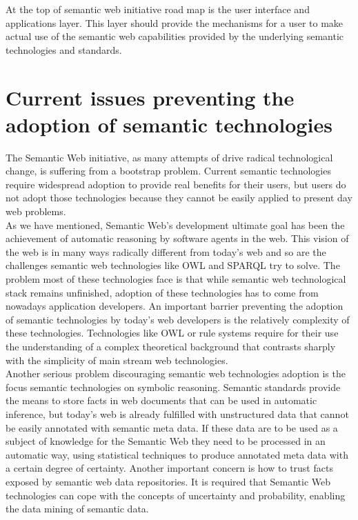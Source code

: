 At the top of semantic web initiative road map is the user interface and applications layer. This layer should provide
the mechanisms for a user to make actual use of the semantic web capabilities provided by the underlying semantic
technologies and standards.

\section{Current issues preventing the adoption of semantic technologies}

The Semantic Web initiative, as many attempts of drive radical technological change, is suffering from a bootstrap
problem. Current semantic technologies require widespread adoption to provide real benefits for their users, but users do not adopt
those technologies because they cannot be easily applied to present day web problems. \\

As we have mentioned, Semantic Web's development ultimate goal has been the achievement of automatic reasoning by software
agents in the web.  This vision of the web is in many ways radically different from today's web and so are the challenges
semantic web technologies like OWL and SPARQL try to solve. The problem most of these technologies face is that
while semantic web technological stack remains unfinished, adoption of these technologies has to come from nowadays
application developers. An important barrier preventing the adoption of semantic technologies by today's web developers is the relatively
complexity of these technologies. Technologies like OWL or rule systems require for their use the understanding of a
complex theoretical background that contrasts sharply with the simplicity of  main stream web technologies. \\

Another serious problem discouraging semantic web technologies adoption is the focus semantic technologies on symbolic
reasoning. Semantic standards provide the means to store facts in web documents that can be used in automatic inference,
but today's web is already fulfilled with unstructured data that cannot be easily annotated with semantic meta data. If these data are to
be used as a subject of knowledge for the Semantic Web they need to be processed in an automatic way, using statistical
techniques to produce annotated meta data with a certain degree of certainty. Another important concern is how to trust
facts exposed by semantic web data repositories. It is required that Semantic Web
technologies can cope with the concepts of uncertainty and probability, enabling the data mining of semantic data. \\

